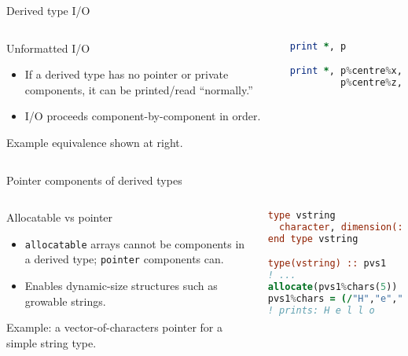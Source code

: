 \begin{frame}[fragile]{Derived type I/O}
  \begin{columns}[T]
    \begin{block}{Unformatted I/O}
      \begin{itemize}
        \item If a derived type has no pointer or private components, it can be printed/read “normally.”
        \item I/O proceeds component-by-component in order.
      \end{itemize}
      Example equivalence shown at right.
    \end{block}

\begin{lstlisting}[language=Fortran]
print *, p

print *, p%centre%x, p%centre%y, &
         p%centre%z, p%radius
\end{lstlisting}
  \end{columns}
\end{frame}

\begin{frame}[fragile]{Pointer components of derived types}
  \begin{columns}[T]
    \begin{block}{Allocatable vs pointer}
      \begin{itemize}
        \item \texttt{allocatable} arrays cannot be components in a derived type; \texttt{pointer} components can.
        \item Enables dynamic-size structures such as growable strings.
      \end{itemize}
      Example: a vector-of-characters pointer for a simple string type.
    \end{block}

\begin{lstlisting}[language=Fortran]
type vstring
  character, dimension(:), pointer :: chars
end type vstring

type(vstring) :: pvs1
! ...
allocate(pvs1%chars(5))
pvs1%chars = (/"H","e","l","l","o"/)
! prints: H e l l o
\end{lstlisting}
  \end{columns}
\end{frame}


